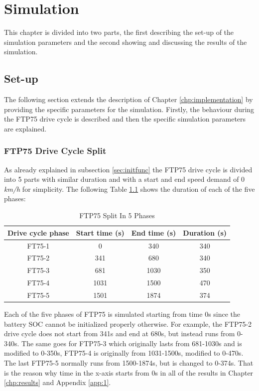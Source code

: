 \chapter{Simulation}
\label{chp:simulation}
This chapter is divided into two parts, the first describing the set-up of the simulation parameters and the second showing and discussing the results of the simulation.

\section{Set-up}
The following section extends the description of Chapter \ref{chp:implementation} by providing the specific parameters for the simulation. Firstly, the behaviour during the FTP75 drive cycle is described and then the specific simulation parameters are explained.

\subsection{FTP75 Drive Cycle Split}
As already explained in subsection \ref{sec:initfunc} the FTP75 drive cycle is divided into 5 parts with similar duration and with a start and end speed demand of 0 \textit{km/h} for simplicity. The following Table \ref{tab:drivecyclephases} shows the duration of each of the five phases:

\begin{table}
\centering
\begin{tabular}{ |c|c|c|c| } 
 \hline
 Drive cycle phase & Start time (s) & End time (s) & Duration (s) \\
 \hline\hline
 FT75-1 & 0 & 340 & 340\\ 
 FT75-2 & 341 & 680 & 340\\ 
 FT75-3 & 681 & 1030 & 350\\ 
 FT75-4 & 1031 & 1500 & 470\\ 
 FT75-5 & 1501 & 1874 & 374\\ 
 \hline
\end{tabular}
\caption{FTP75 Split In 5 Phases}
\label{tab:drivecyclephases}
\end{table}

Each of the five phases of FTP75 is simulated starting from time 0s since the battery SOC cannot be initialized properly otherwise. For example, the FTP75-2 drive cycle does not start from 341s and end at 680s, but instead runs from 0-340s. The same goes for FTP75-3 which originally lasts from 681-1030s and is modified to 0-350s, FTP75-4 is originally from 1031-1500s, modified to 0-470s. The last FTP75-5 normally runs from 1500-1874s, but is changed to 0-374s. That is the reason why time in the x-axis starts from 0s in all of the results in Chapter \ref{chp:results} and Appendix \ref{app:1}.


